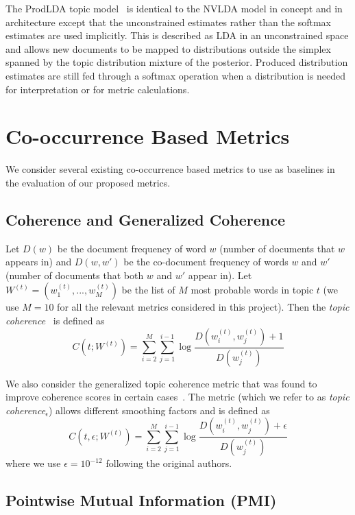 \documentclass[10pt]{article}
\begin{document}
The ProdLDA topic model~\cite{Srivastava:2017} is identical to the NVLDA model in concept and in architecture except that the unconstrained estimates rather than the softmax estimates are used implicitly. This is described as LDA in an unconstrained space and allows new documents to be mapped to distributions outside the simplex spanned by the topic distribution mixture of the posterior. Produced distribution estimates are still fed through a softmax operation when a distribution is needed for interpretation or for metric calculations.

\section{Co-occurrence Based Metrics}

We consider several existing co-occurrence based metrics to use as baselines in the evaluation of our proposed metrics.

\subsection{Coherence and Generalized Coherence}

Let $D(w)$ be the document frequency of word $w$ (number of documents that $w$ appears in) and $D(w,w')$ be the co-document frequency of words $w$ and $w'$ (number of documents that both $w$ and $w'$ appear in). Let $W^{(t)}=\left(w_1^{(t)},...,w_M^{(t)}\right)$ be the list of $M$ most probable words in topic $t$ (we use $M=10$ for all the relevant metrics considered in this project). Then the \textit{topic coherence}~\cite{Mimno:2011} is defined as
\[
C\left(t;W^{(t)}\right)=\sum_{i=2}^M\sum_{j=1}^{i-1}\log\frac{D\left(w_i^{(t)},w_j^{(t)}\right)+1}{D\left(w_j^{(t)}\right)}
\]

We also consider the generalized topic coherence metric that was found to improve coherence scores in certain cases~\cite{Stevens:2012}. The metric (which we refer to as \textit{topic coherence$_\epsilon$}) allows different smoothing factors and is defined as
\[
C\left(t,\epsilon;W^{(t)}\right)=\sum_{i=2}^M\sum_{j=1}^{i-1}\log\frac{D\left(w_i^{(t)},w_j^{(t)}\right)+\epsilon}{D\left(w_j^{(t)}\right)}
\]
where we use $\epsilon=10^{-12}$ following the original authors.

\subsection{Pointwise Mutual Information (PMI)}
\end{document}
